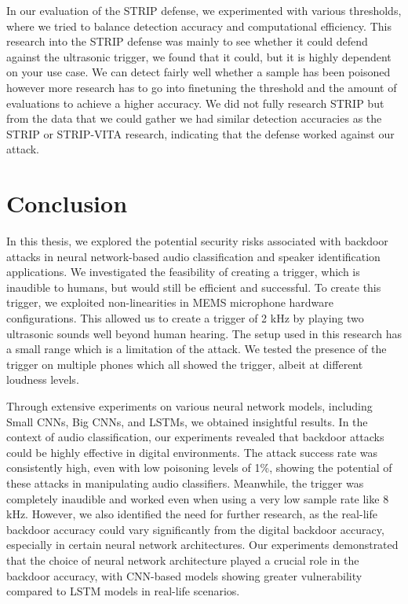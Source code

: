 \documentclass{report}
\theoremstyle{definition}
\theoremstyle{remark}
\begin{document}
\begin{minipage}{\textwidth}
\begin{minipage}{.4\textwidth}
    \label{fig:nonPoisonedSample}
\end{minipage}
\end{minipage}

In our evaluation of the STRIP defense, we experimented with various thresholds, where we tried to balance detection accuracy and computational efficiency. This research into the STRIP defense was mainly to see whether it could defend against the ultrasonic trigger, we found that it could, but it is highly dependent on your use case. We can detect fairly well whether a sample has been poisoned however more research has to go into finetuning the threshold and the amount of evaluations to achieve a higher accuracy. We did not fully research STRIP but from the data that we could gather we had similar detection accuracies as the STRIP \cite{Strip} or STRIP-VITA\cite{StripVita} research, indicating that the defense worked against our attack.

\chapter{Conclusion}
In this thesis, we explored the potential security risks associated with backdoor attacks in neural network-based audio classification and speaker identification applications. We investigated the feasibility of creating a trigger, which is inaudible to humans, but would still be efficient and successful. To create this trigger, we exploited non-linearities in MEMS microphone hardware configurations. This allowed us to create a trigger of 2 kHz by playing two ultrasonic sounds well beyond human hearing. The setup used in this research has a small range which is a limitation of the attack. We tested the presence of the trigger on multiple phones which all showed the trigger, albeit at different loudness levels.

Through extensive experiments on various neural network models, including Small CNNs, Big CNNs, and LSTMs, we obtained insightful results. In the context of audio classification, our experiments revealed that backdoor attacks could be highly effective in digital environments. The attack success rate was consistently high, even with low poisoning levels of 1\%, showing the potential of these attacks in manipulating audio classifiers. Meanwhile, the trigger was completely inaudible and worked even when using a very low sample rate like 8 kHz. However, we also identified the need for further research, as the real-life backdoor accuracy could vary significantly from the digital backdoor accuracy, especially in certain neural network architectures. Our experiments demonstrated that the choice of neural network architecture played a crucial role in the backdoor accuracy, with CNN-based models showing greater vulnerability compared to LSTM models in real-life scenarios. 
\end{document}
